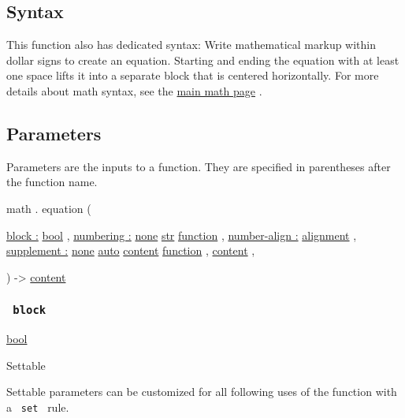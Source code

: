 \subsection{Syntax}\label{syntax}

This function also has dedicated syntax: Write mathematical markup
within dollar signs to create an equation. Starting and ending the
equation with at least one space lifts it into a separate block that is
centered horizontally. For more details about math syntax, see the
\href{/docs/reference/math/}{main math page} .

\subsection{\texorpdfstring{{ Parameters
}}{ Parameters }}\label{parameters}

\label{parameters-tooltip}
Parameters are the inputs to a function. They are specified in
parentheses after the function name.

math { . } { equation } (

{ \hyperref[parameters-block]{block :}
\href{/docs/reference/foundations/bool/}{bool} , } {
\hyperref[parameters-numbering]{numbering :}
\href{/docs/reference/foundations/none/}{none}
\href{/docs/reference/foundations/str/}{str}
\href{/docs/reference/foundations/function/}{function} , } {
\hyperref[parameters-number-align]{number-align :}
\href{/docs/reference/layout/alignment/}{alignment} , } {
\hyperref[parameters-supplement]{supplement :}
\href{/docs/reference/foundations/none/}{none}
\href{/docs/reference/foundations/auto/}{auto}
\href{/docs/reference/foundations/content/}{content}
\href{/docs/reference/foundations/function/}{function} , } {
\href{/docs/reference/foundations/content/}{content} , }

) -\textgreater{} \href{/docs/reference/foundations/content/}{content}

\subsubsection{\texorpdfstring{\texttt{\ block\ }}{ block }}\label{parameters-block}

\href{/docs/reference/foundations/bool/}{bool}

{{ Settable }}

\label{parameters-block-settable-tooltip}
Settable parameters can be customized for all following uses of the
function with a \texttt{\ set\ } rule.

